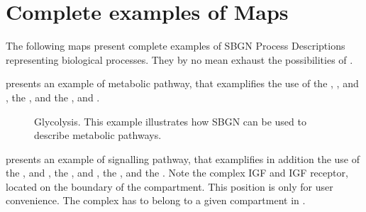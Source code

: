 \chapter{Complete examples of \PD Maps}

The following maps present complete examples of SBGN Process Descriptions representing biological processes. They by no mean exhaust the possibilities of  \SBGNPDLone.

 presents an example of metabolic pathway, that examplifies the use of the  , , and , the  , and the  ,  and .

\begin{figure}[htb]
\begin{center}
\caption{Glycolysis. This example illustrates how SBGN can be used to describe metabolic pathways.}
\label{fig:glycolysis}
\end{center}
\end{figure}

 presents an example of signalling pathway, that examplifies in addition the use of the  , and , the  ,  and , the  , and the  . Note the complex IGF and IGF receptor, located on the boundary of the compartment. This position is only for user convenience. The complex has to belong to a given compartment in \SBGNPDLone.

